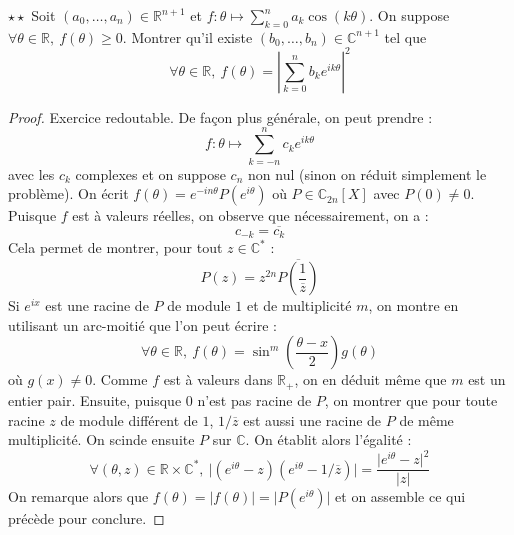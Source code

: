 \documentclass[french,a4paper]{article}
\newcommand{\R}{\mathbb{R}}
\newcommand{\C}{\mathbb{C}}
\newcommand{\st}{^*}
\theoremstyle{plain}
\theoremstyle{definition}
\theoremstyle{remark}
\begin{document}
\begin{ex}{$\star\star$}
	Soit $(a_0,\ldots,a_n)\in\R^{n+1}$ et $f:\theta\mapsto\displaystyle\sum_{k=0}^{n}a_k\cos(k\theta)$. On suppose $\forall\theta\in\R,\ f(\theta)\geqslant0$. Montrer qu'il existe $(b_0,\ldots,b_n)\in\C^{n+1}$ tel que $$\forall\theta\in\R,\ f(\theta)=\left\lvert\sum_{k=0}^{n}b_ke^{ik\theta}\right\rvert^2$$
\end{ex}
\begin{proof}
	Exercice redoutable. De façon plus générale, on peut prendre : $$f:\theta\mapsto\sum_{k=-n}^{n}c_ke^{ik\theta}$$ avec les $c_k$ complexes et on suppose $c_n$ non nul (sinon on réduit simplement le problème). On écrit $f(\theta)=e^{-in\theta}P(e^{i\theta})$ où $P\in\C_{2n}[X]$ avec $P(0)\ne 0$. Puisque $f$ est à valeurs réelles, on observe que nécessairement, on a : $$c_{-k}=\overline{c_k}$$ Cela permet de montrer, pour tout $z\in\C\st$ : $$P(z)=z^{2n}\displaystyle\overline{P\left(\frac{1}{\overline{z}}\right)}$$ Si $e^{ix}$ est une racine de $P$ de module $1$ et de multiplicité $m$, on montre en utilisant un arc-moitié que l'on peut écrire : $$\forall\theta\in\R,\ f(\theta)=\sin^m\left(\frac{\theta-x}{2}\right)g(\theta)$$ où $g(x)\ne 0$. Comme $f$ est à valeurs dans $\R_+$, on en déduit même que $m$ est un entier pair. Ensuite, puisque $0$ n'est pas racine de $P$, on montrer que pour toute racine $z$ de module différent de $1$, $1/\overline{z}$ est aussi une racine de $P$ de même multiplicité. On scinde ensuite $P$ sur $\C$. On établit alors l'égalité : $$\forall(\theta,z)\in\R\times\C\st,\ \lvert (e^{i\theta}-z)(e^{i\theta}-1/\overline{z})\rvert=\frac{\lvert e^{i\theta}-z\rvert^2}{\lvert z\rvert}$$ On remarque alors que $f(\theta)=\lvert f(\theta)\rvert=\lvert P(e^{i\theta})\rvert$ et on assemble ce qui précède pour conclure.
\end{proof}
\end{document}
